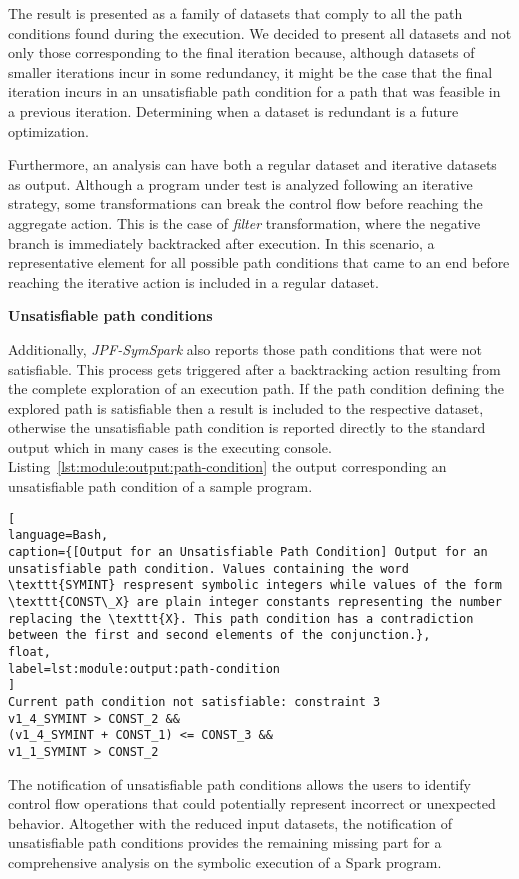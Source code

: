 The result is presented as a family of datasets that comply to all the path conditions found during the execution. We decided to present all datasets and not only those corresponding to the final iteration because, although datasets of smaller iterations incur in some redundancy, it might be the case that the final iteration incurs in an unsatisfiable path condition for a path that was feasible in a previous iteration. Determining when a dataset is redundant is a future optimization.

Furthermore, an analysis can have both a regular dataset and iterative datasets as output. Although a program under test is analyzed following an iterative strategy, some transformations can break the control flow before reaching the aggregate action. This is the case of \textit{filter} transformation, where the negative branch is immediately backtracked after execution. In this scenario, a representative element for all possible path conditions that came to an end before reaching the iterative action is included in a regular dataset.

\textbf{Unsatisfiable path conditions}

Additionally, \textit{JPF-SymSpark} also reports those path conditions that were not satisfiable. This process gets triggered after a backtracking action resulting from the complete exploration of an execution path. If the path condition defining the explored path is satisfiable then a result is included to the respective dataset, otherwise the unsatisfiable path condition is reported directly to the standard output which in many cases is the executing console. Listing~\ref{lst:module:output:path-condition} the output corresponding an unsatisfiable path condition of a sample program.

\begin{lstlisting}[
language=Bash,
caption={[Output for an Unsatisfiable Path Condition] Output for an unsatisfiable path condition. Values containing the word \texttt{SYMINT} respresent symbolic integers while values of the form \texttt{CONST\_X} are plain integer constants representing the number replacing the \texttt{X}. This path condition has a contradiction between the first and second elements of the conjunction.},
float,
label=lst:module:output:path-condition
]
Current path condition not satisfiable: constraint 3
v1_4_SYMINT > CONST_2 &&
(v1_4_SYMINT + CONST_1) <= CONST_3 &&
v1_1_SYMINT > CONST_2
\end{lstlisting}

The notification of unsatisfiable path conditions allows the users to identify control flow operations that could potentially represent incorrect or unexpected behavior. Altogether with the reduced input datasets, the notification of unsatisfiable path conditions provides the remaining missing part for a comprehensive analysis on the symbolic execution of a Spark program.